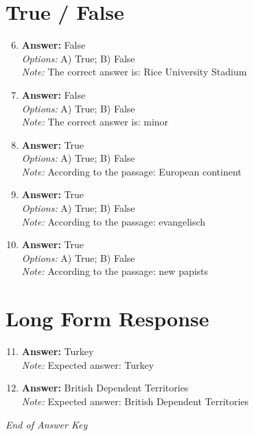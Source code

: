\documentclass[12pt]{article}
\begin{document}
\section*{True / False}
\begin{enumerate}[label=\arabic*.]
\setcounter{enumi}{5}
\item \textbf{Answer:} False
\\ \textit{Options:} A) True; B) False
\\ \textit{Note:} The correct answer is: Rice University Stadium
\item \textbf{Answer:} False
\\ \textit{Options:} A) True; B) False
\\ \textit{Note:} The correct answer is: minor
\item \textbf{Answer:} True
\\ \textit{Options:} A) True; B) False
\\ \textit{Note:} According to the passage: European continent
\item \textbf{Answer:} True
\\ \textit{Options:} A) True; B) False
\\ \textit{Note:} According to the passage: evangelisch
\item \textbf{Answer:} True
\\ \textit{Options:} A) True; B) False
\\ \textit{Note:} According to the passage: new papists
\end{enumerate}

\section*{Long Form Response}
\begin{enumerate}[label=\arabic*.]
\setcounter{enumi}{10}
\item \textbf{Answer:} Turkey
\\ \textit{Note:} Expected answer: Turkey
\item \textbf{Answer:} British Dependent Territories
\\ \textit{Note:} Expected answer: British Dependent Territories
\end{enumerate}

\vfill
\noindent\textit{End of Answer Key}
\end{document}
